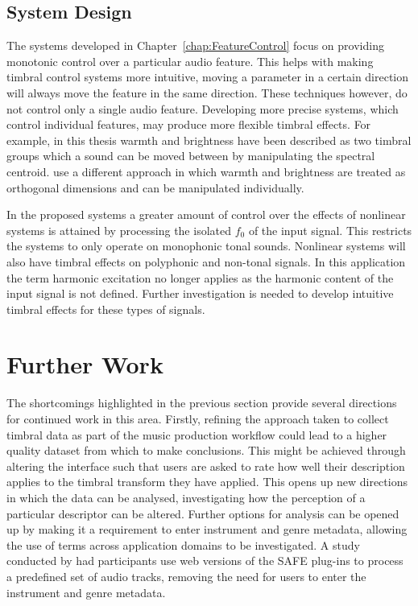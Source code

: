 	\subsection{System Design}
	\label{sec:Conclusion-Critique-SystemDesign}
		The systems developed in Chapter~\ref{chap:FeatureControl} focus on providing monotonic control over a
		particular audio feature. This helps with making timbral control systems more intuitive, moving a parameter
		in a certain direction will always move the feature in the same direction. These techniques however, do not
		control only a single audio feature. Developing more precise systems, which control individual features, may
		produce more flexible timbral effects. For example, in this thesis warmth and brightness have been described
		as two timbral groups which a sound can be moved between by manipulating the spectral centroid.
		\cite{zacharakis2011an} use a different approach in which warmth and brightness are treated as orthogonal
		dimensions and can be manipulated individually.

		In the proposed systems a greater amount of control over the effects of nonlinear systems is attained by
		processing the isolated $f_{0}$ of the input signal. This restricts the systems to only operate on
		monophonic tonal sounds. Nonlinear systems will also have timbral effects on polyphonic and non-tonal
		signals. In this application the term harmonic excitation no longer applies as the harmonic content of the
		input signal is not defined. Further investigation is needed to develop intuitive timbral effects for these
		types of signals.

\section{Further Work}
\label{sec:Conclusion-FurtherWork}
	The shortcomings highlighted in the previous section provide several directions for continued work in this area.
	Firstly, refining the approach taken to collect timbral data as part of the music production workflow could lead to
	a higher quality dataset from which to make conclusions. This might be achieved through altering the interface such
	that users are asked to rate how well their description applies to the timbral transform they have applied. This
	opens up new directions in which the data can be analysed, investigating how the perception of a particular
	descriptor can be altered. Further options for analysis can be opened up by making it a requirement to enter
	instrument and genre metadata, allowing the use of terms across application domains to be investigated. A study
	conducted by \citet{stasis2017audio} had participants use web versions of the SAFE plug-ins to process a predefined
	set of audio tracks, removing the need for users to enter the instrument and genre metadata.

